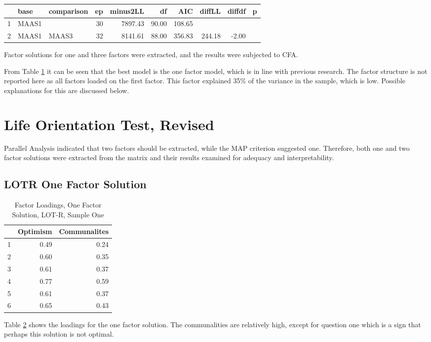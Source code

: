 \documentclass{article}
\begin{document}
\begin{table}[ht]
\centering
\begin{tabular}{rllrrrrrrr}
  \hline
 & base & comparison & ep & minus2LL & df & AIC & diffLL & diffdf & p \\ 
  \hline
1 & MAAS1 &  &  30 & 7897.43 & 90.00 & 108.65 &  &  &  \\ 
  2 & MAAS1 & MAAS3 &  32 & 8141.61 & 88.00 & 356.83 & 244.18 & -2.00 &  \\ 
   \hline
\end{tabular}
\label{tab:maassemcomp}
\end{table}
Factor solutions for one and three factors were extracted, and the results were subjected to CFA.

From Table \ref{tab:maassemcomp} it can be seen that the best model is the one factor model, which is in line with previous research.
The factor structure is not reported here as all factors loaded on the first factor.  This factor explained 35\% of the variance
in the sample, which is low.  Possible explanations for this are discussed below. 


\section{Life Orientation Test, Revised}

Parallel Analysis indicated that two factors should be extracted, while the MAP criterion suggested one.  Therefore, both one and two factor solutions were extracted from the matrix and their results examined for adequacy and interpretability.

\subsection{LOTR One Factor Solution}
\label{sec:lotr-one-factor}


\begin{table}[ht]
\centering
\begin{tabular}{rrr}
  \hline
 & Optimism & Communalites \\ 
  \hline
1 & 0.49 & 0.24 \\ 
  2 & 0.60 & 0.35 \\ 
  3 & 0.61 & 0.37 \\ 
  4 & 0.77 & 0.59 \\ 
  5 & 0.61 & 0.37 \\ 
  6 & 0.65 & 0.43 \\ 
   \hline
\end{tabular}
\caption{Factor Loadings, One Factor Solution, LOT-R, Sample One} 
\label{tab:hom1lotr1fact}
\end{table}
Table \ref{tab:hom1lotr1fact} shows the loadings for the one factor solution. The communalities are relatively high, except for question one which is a sign that perhaps this solution is not optimal. 
\end{document}
